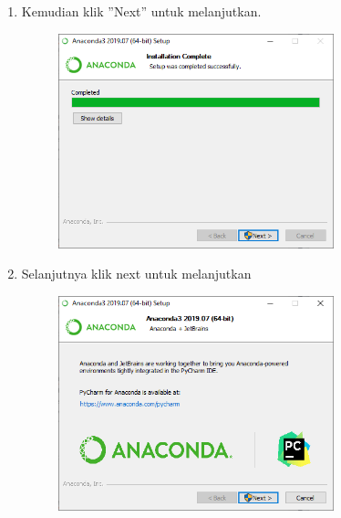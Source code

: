 \begin{enumerate}
	\item Kemudian klik ''Next'' untuk melanjutkan.
	\begin{figure}[!htbp]
		\includegraphics[width=8cm]{figures/ana6.PNG}
		\centering
	\end{figure}
\newpage
	\item Selanjutnya klik next untuk melanjutkan
	\begin{figure}[!htbp]
		\includegraphics[width=8cm]{figures/ana7.PNG}
		\centering
	\end{figure}


\end{enumerate}
